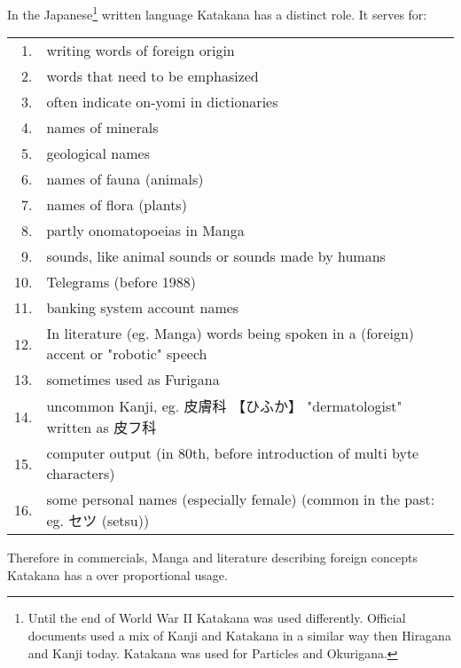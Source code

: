 In the Japanese\footnote{Until the end of World War II Katakana was used
differently. Official documents used a mix of Kanji and Katakana in a similar
way then Hiragana and Kanji today. Katakana was used for Particles and
Okurigana.} written language Katakana has a distinct role. It serves for:

\bigskip

\begin{tabular}{rp{15cm}}
1.& writing words of foreign origin\\
2.& words that need to be emphasized\\
3. &often indicate on-yomi in dictionaries\\
4.& names of minerals \\
5.& geological names \\
6.& names of fauna (animals)\\
7.& names of flora (plants)\\
8.& partly onomatopoeias in Manga\\
9.& sounds, like animal sounds or sounds made by humans\\
10.& Telegrams (before 1988)\\
11.& banking system account names\\
12.& In literature (eg. Manga) words being spoken in a (foreign) accent or "robotic" speech\\
13. &sometimes used as Furigana\\
14. & uncommon Kanji, eg.  {皮膚科} {【ひふか】} "dermatologist" written as {皮フ科}\\
15.& computer output (in 80th, before introduction of multi byte characters)\\
16. &some personal names (especially female) (common in the past: eg. セツ (setsu))\\

\end{tabular}

\medskip

Therefore in commercials, Manga and literature describing foreign concepts
Katakana has a over proportional usage.



%

